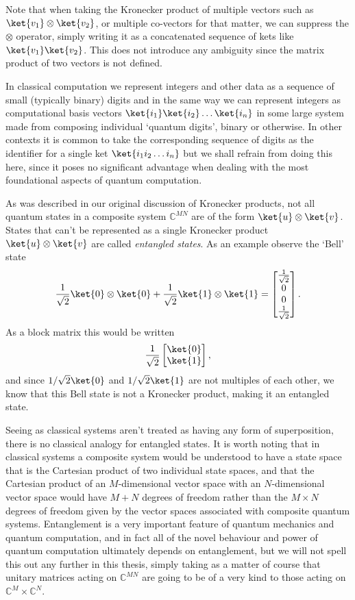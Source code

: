 Note that when taking the Kronecker product of multiple vectors such as $\ket{v_1}\otimes\ket{v_2}$, or multiple co-vectors for that matter, we can suppress the $\otimes$ operator, simply writing it as a concatenated sequence of kets like $\ket{v_1}\ket{v_2}$. This does not introduce any ambiguity since the matrix product of two vectors is not defined.

In classical computation we represent integers and other data as a sequence of small (typically binary) digits and in the same way we can represent integers as computational basis vectors $\ket{i_1}\ket{i_2}\dots\ket{i_n}$ in some large system made from composing individual `quantum digits', binary or otherwise. In other contexts it is common to take the corresponding sequence of digits as the identifier for a single ket $\ket{i_1i_2\dots i_n}$ but we shall refrain from doing this here, since it poses no significant advantage when dealing with the most foundational aspects of quantum computation.

As was described in our original discussion of Kronecker products, not all quantum states in a composite system $\mathbb{C}^{MN}$ are of the form $\ket{u}\otimes\ket{v}$. States that can't be represented as a single Kronecker product $\ket{u}\otimes\ket{v}$ are called \emph{entangled states}. As an example observe the `Bell' state
\[\frac{1}{\sqrt{2}}\ket{0}\otimes\ket{0} + \frac{1}{\sqrt{2}}\ket{1}\otimes\ket{1} = \left[\begin{matrix}
\frac{1}{\sqrt{2}}\\
0\\
0\\
\frac{1}{\sqrt{2}}
\end{matrix}\right].\]
As a block matrix this would be written
\[\frac{1}{\sqrt{2}}\begin{bmatrix}
\ket{0} \\
\ket{1}
\end{bmatrix},\]
and since $1/\sqrt{2}\ket{0}$ and $1/\sqrt{2}\ket{1}$ are not multiples of each other, we know that this Bell state is not a Kronecker product, making it an entangled state.

Seeing as classical systems aren't treated as having any form of superposition, there is no classical analogy for entangled states. It is worth noting that in classical systems a composite system would be understood to have a state space that is the Cartesian product of two individual state spaces, and that the Cartesian product of an $M$-dimensional vector space with an $N$-dimensional vector space would have $M+N$ degrees of freedom rather than the $M\times N$ degrees of freedom given by the vector spaces associated with composite quantum systems.  Entanglement is a very important feature of quantum mechanics and quantum computation, and in fact all of the novel behaviour and power of quantum computation ultimately depends on entanglement, but we will not spell this out any further in this thesis, simply taking as a matter of course that unitary matrices acting on $\mathbb{C}^{MN}$ are going to be of a very kind to those acting on $\mathbb{C}^M\times \mathbb{C}^N$. 
